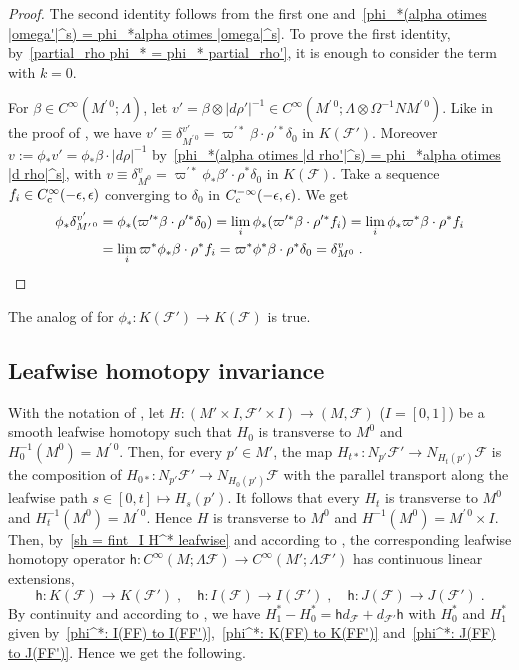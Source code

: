 \documentclass{memo-l}
\theoremstyle{plain}
\theoremstyle{definition}
\theoremstyle{remark}
\newcommand{\FF}{\mathcal{F}}
\newcommand{\sh}{\mathsf{h}}
\newcommand{\co}{{\text{\rm c}}}
\newcommand{\Cinftyc}{C^\infty_{\text{\rm c}}}
\numberwithin{section}{chapter}
\numberwithin{equation}{section}%
\begin{document}
\begin{proof}
The second identity follows from the first one and~\eqref{phi_*(alpha otimes |omega'|^s) = phi_*alpha otimes |omega|^s}. To prove the first identity, by~\eqref{partial_rho phi_* = phi_* partial_rho'}, it is enough to consider the term with $k=0$. 

For $\beta\in C^\infty(M^{\prime\,0};\Lambda)$, let $v'=\beta\otimes|d\rho'|^{-1}\in C^\infty(M^{\prime\,0};\Lambda\otimes\Omega^{-1}NM^{\prime\,0})$. Like in the proof of , we have $v'\equiv\delta_{M^{\prime\,0}}^{v'}=\varpi^{\prime*}\beta\cdot\rho^{\prime*}\delta_0$ in $K(\FF')$. Moreover $v:=\phi_*v'=\phi_*\beta\cdot|d\rho|^{-1}$ by~\eqref{phi_*(alpha otimes |d rho'|^s) = phi_*alpha otimes |d rho|^s}, with $v\equiv\delta_{M^0}^v=\varpi^{\prime*}\phi_*\beta'\cdot\rho^*\delta_0$ in $K(\FF)$. Take a sequence $f_i\in\Cinftyc(-\epsilon,\epsilon)$ converging to $\delta_0$ in $C^{-\infty}_\co(-\epsilon,\epsilon)$. We get
\begin{align*}
\phi_*\delta_{M^{\prime\,0}}^{v'}&=\phi_*(\varpi^{\prime*}\beta\cdot\rho^{\prime*}\delta_0)
=\lim_i\phi_*(\varpi^{\prime*}\beta\cdot\rho^{\prime*}f_i)
=\lim_i\phi_*\varpi^*\beta\cdot\rho^*f_i\\
&=\lim_i\varpi^*\phi_*\beta\cdot\rho^*f_i
=\varpi^*\phi^*\beta\cdot\rho^*\delta_0
=\delta_{M^0}^v\;.\qedhere
\end{align*}
\end{proof}

The analog of  for $\phi_*:K(\FF')\to K(\FF)$ is true.


\subsection{Leafwise homotopy invariance}\label{ss: leafwise homotopy invariance}

With the notation of , let $H:(M'\times I,\FF'\times I)\to(M,\FF)$ ($I=[0,1]$) be a smooth leafwise homotopy such that $H_0$ is transverse to $M^0$ and $H_0^{-1}(M^0)=M^{\prime\,0}$. Then, for every $p'\in M'$, the map $H_{t*}:N_{p'}\FF'\to N_{H_t(p')}\FF$ is the composition of $H_{0*}:N_{p'}\FF'\to N_{H_0(p')}\FF$ with the parallel transport along the leafwise path $s\in[0,t]\mapsto H_s(p')$. It follows that every $H_t$ is transverse to $M^0$ and $H_t^{-1}(M^0)=M^{\prime\,0}$. Hence $H$ is transverse to $M^0$ and $H^{-1}(M^0)=M^{\prime\,0}\times I$. Then, by~\eqref{sh = fint_I H^* leafwise} and according to , the corresponding leafwise homotopy operator $\sh:C^\infty(M;\Lambda\FF)\to C^\infty(M';\Lambda\FF')$ has continuous linear extensions,
\[
\sh:K(\FF)\to K(\FF')\;,\quad\sh:I(\FF)\to I(\FF')\;,\quad\sh:J(\FF)\to J(\FF')\;.
\]
By continuity and according to , we have $H_1^*-H_0^*=\sh d_\FF+d_{\FF'}\sh$ with $H_0^*$ and $H_1^*$ given by~\eqref{phi^*: I(FF) to I(FF')},~\eqref{phi^*: K(FF) to K(FF')} and~\eqref{phi^*: J(FF) to J(FF')}. Hence we get the following.
\end{document}
